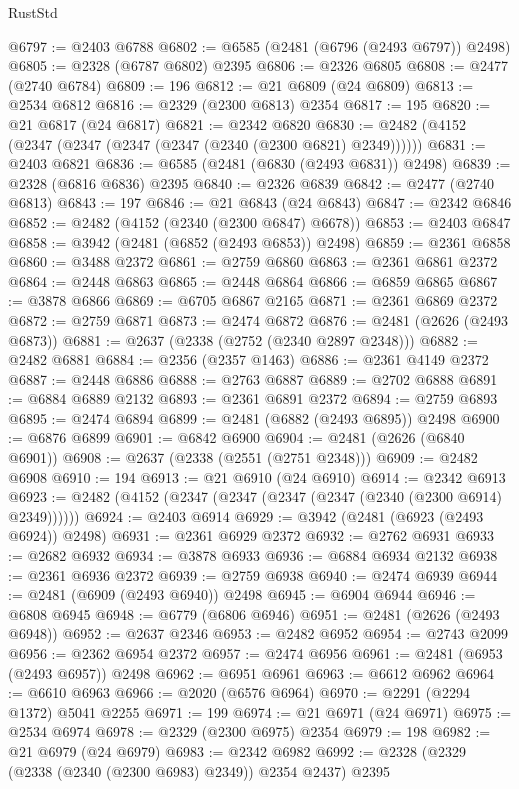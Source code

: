 \begin{lexlean}{RustStd}
\begin{coremodule}
{\begin{coremodule}
{{{{{{{{{{{{{{{{{{{{{{{{{{{{{{{{{{{{{@6797 := @2403 @6788
@6802 := @6585 (@2481 (@6796 (@2493 @6797)) @2498)
@6805 := @2328 (@6787 @6802) @2395
@6806 := @2326 @6805
@6808 := @2477 (@2740 @6784)
@6809 := 196
@6812 := @21 @6809 (@24 @6809)
@6813 := @2534 @6812
@6816 := @2329 (@2300 @6813) @2354
@6817 := 195
@6820 := @21 @6817 (@24 @6817)
@6821 := @2342 @6820
@6830 := @2482 (@4152 (@2347 (@2347 (@2347 (@2347 (@2340 (@2300 @6821) @2349))))))
@6831 := @2403 @6821
@6836 := @6585 (@2481 (@6830 (@2493 @6831)) @2498)
@6839 := @2328 (@6816 @6836) @2395
@6840 := @2326 @6839
@6842 := @2477 (@2740 @6813)
@6843 := 197
@6846 := @21 @6843 (@24 @6843)
@6847 := @2342 @6846
@6852 := @2482 (@4152 (@2340 (@2300 @6847) @6678))
@6853 := @2403 @6847
@6858 := @3942 (@2481 (@6852 (@2493 @6853)) @2498)
@6859 := @2361 @6858
@6860 := @3488 @2372
@6861 := @2759 @6860
@6863 := @2361 @6861 @2372
@6864 := @2448 @6863
@6865 := @2448 @6864
@6866 := @6859 @6865
@6867 := @3878 @6866
@6869 := @6705 @6867 @2165
@6871 := @2361 @6869 @2372
@6872 := @2759 @6871
@6873 := @2474 @6872
@6876 := @2481 (@2626 (@2493 @6873))
@6881 := @2637 (@2338 (@2752 (@2340 @2897 @2348)))
@6882 := @2482 @6881
@6884 := @2356 (@2357 @1463)
@6886 := @2361 @4149 @2372
@6887 := @2448 @6886
@6888 := @2763 @6887
@6889 := @2702 @6888
@6891 := @6884 @6889 @2132
@6893 := @2361 @6891 @2372
@6894 := @2759 @6893
@6895 := @2474 @6894
@6899 := @2481 (@6882 (@2493 @6895)) @2498
@6900 := @6876 @6899
@6901 := @6842 @6900
@6904 := @2481 (@2626 (@6840 @6901))
@6908 := @2637 (@2338 (@2551 (@2751 @2348)))
@6909 := @2482 @6908
@6910 := 194
@6913 := @21 @6910 (@24 @6910)
@6914 := @2342 @6913
@6923 := @2482 (@4152 (@2347 (@2347 (@2347 (@2347 (@2340 (@2300 @6914) @2349))))))
@6924 := @2403 @6914
@6929 := @3942 (@2481 (@6923 (@2493 @6924)) @2498)
@6931 := @2361 @6929 @2372
@6932 := @2762 @6931
@6933 := @2682 @6932
@6934 := @3878 @6933
@6936 := @6884 @6934 @2132
@6938 := @2361 @6936 @2372
@6939 := @2759 @6938
@6940 := @2474 @6939
@6944 := @2481 (@6909 (@2493 @6940)) @2498
@6945 := @6904 @6944
@6946 := @6808 @6945
@6948 := @6779 (@6806 @6946)
@6951 := @2481 (@2626 (@2493 @6948))
@6952 := @2637 @2346
@6953 := @2482 @6952
@6954 := @2743 @2099
@6956 := @2362 @6954 @2372
@6957 := @2474 @6956
@6961 := @2481 (@6953 (@2493 @6957)) @2498
@6962 := @6951 @6961
@6963 := @6612 @6962
@6964 := @6610 @6963
@6966 := @2020 (@6576 @6964)
@6970 := @2291 (@2294 @1372) @5041 @2255
@6971 := 199
@6974 := @21 @6971 (@24 @6971)
@6975 := @2534 @6974
@6978 := @2329 (@2300 @6975) @2354
@6979 := 198
@6982 := @21 @6979 (@24 @6979)
@6983 := @2342 @6982
@6992 := @2328 (@2329 (@2338 (@2340 (@2300 @6983) @2349)) @2354 @2437) @2395
}}}}}}}}}}}}}}}}}}}}}}}}}}}}}}}}}}}}}
\end{coremodule}}
\end{coremodule}
\end{lexlean}
